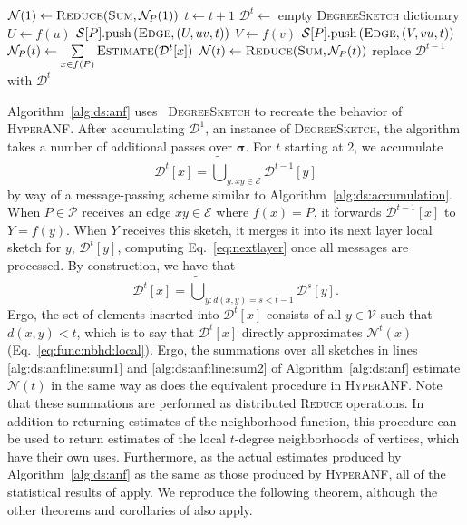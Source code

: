 \documentclass{report}
\newcommand{\push}[1]{\text{push} \left ( #1 \right )}
\newcommand{\algoname}[1]{\textnormal{\textsc{#1}}}
\begin{document}
\begin{algorithm}[htbp]
\begin{flushleft}
\begin{algorithmic}[1]
		\State $\mathcal{N}(1) \gets \algoname{Reduce}(\algoname{Sum}, \mathcal{N}_P(1))$
			\State $t \gets t + 1$
			\State $\mathcal{D}^t \gets $ empty \algoname{DegreeSketch} dictionary
				\State $U \gets f(u)$
	 			\State $\mathcal{S}[P].\push{\algoname{Edge}, (U, uv, t)}$
				\State $V \gets f(v)$
 				\State $\mathcal{S}[P].\push{\algoname{Edge}, (V, vu, t)}$
			\EndWhile
			\State $\mathcal{N}_P(t) \gets \sum\limits_{x \in f(P)} \algoname{Estimate}(\mathcal{D}^t[x])$ \label{alg:ds:anf:line:sum2}
			\State $\mathcal{N}(t) \gets \algoname{Reduce}(\algoname{Sum}, \mathcal{N}_P(t))$
			\State replace $\mathcal{D}^{t-1}$ with $\mathcal{D}^t$
		\EndWhile
\end{algorithmic}
\end{flushleft}
\end{algorithm}

Algorithm~\ref{alg:ds:anf} uses ~\algoname{DegreeSketch} to recreate the behavior of \algoname{HyperANF}.
After accumulating $\mathcal{D}^1$, an instance of \algoname{DegreeSketch}, the algorithm takes a number of additional passes over $\boldsymbol{\sigma}$. 
For $t$ starting at 2, we accumulate 
%
\begin{equation} \label{eq:nextlayer}
\mathcal{D}^t[x] = \widetilde{\bigcup}_{y: xy \in \mathcal{E}} \mathcal{D}^{t-1}[y]
\end{equation}
%
by way of a message-passing scheme similar to Algorithm~\ref{alg:ds:accumulation}.
When $P \in \mathcal{P}$ receives an edge $xy \in \mathcal{E}$ where $f(x) = P$, it forwards $\mathcal{D}^{t-1}[x]$ to $Y = f(y)$.
When $Y$ receives this sketch, it merges it into its next layer local sketch for $y$, $\mathcal{D}^t[y]$, computing Eq.~\eqref{eq:nextlayer} once all messages are processed.
By construction, we have that
%
\begin{equation} \label{eq:nextlayer:full}
\mathcal{D}^t[x] = \widetilde{\bigcup}_{y: d(x,y) = s < t-1} \mathcal{D}^{s}[y].
\end{equation}
%
Ergo, the set of elements inserted into $\mathcal{D}^t[x]$ consists of all $y \in \mathcal{V}$ such that $d(x,y) < t$, which is to say that $\mathcal{D}^t[x]$ directly approximates $\mathcal{N}^t(x)$ (Eq.~\eqref{eq:func:nbhd:local}). 
Ergo, the summations over all sketches in lines \ref{alg:ds:anf:line:sum1} and \ref{alg:ds:anf:line:sum2} of Algorithm~\ref{alg:ds:anf} estimate $\mathcal{N}(t)$ in the same way as does the equivalent procedure in \algoname{HyperANF}.
Note that these summations are performed as distributed \algoname{Reduce} operations.
In addition to returning estimates of the neighborhood function, this procedure can be used to return estimates of the local $t$-degree neighborhoods of vertices, which have their own uses.
Furthermore, as the actual estimates produced by Algorithm~\ref{alg:ds:anf} as the same as those produced by \algoname{HyperANF}, all of the statistical results of \cite{boldi2011hyperanf} apply.
We reproduce the following theorem, although the other theorems and corollaries of \cite{boldi2011hyperanf} also apply. 
\end{document}
